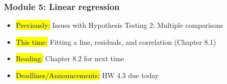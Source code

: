 
\begin{frame}
    \frametitle{Module 5: Linear regression}
    \begin{itemize}
        \item \hl{Previously: }Issues with Hypothesis Testing 2: Multiple comparisons
        \item \hl{This time: }Fitting a line, residuals, and correlation (Chapter 8.1)
        \item \hl{Reading: }Chapter 8.2 for next time
        \item \hl{Deadlines/Announcements: }HW 4.3 due today
    \end{itemize}
    
\end{frame}